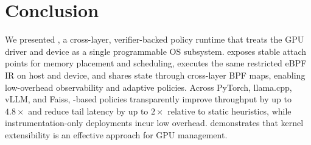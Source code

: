 \section{Conclusion}
\label{sec:conclusion}
We presented \sys, a cross-layer, verifier-backed policy runtime that treats the GPU driver and device as a single programmable OS subsystem. \sys exposes stable attach points for memory placement and scheduling, executes the same restricted eBPF IR on host and device, and shares state through cross-layer BPF maps, enabling low-overhead observability and adaptive policies. Across PyTorch, llama.cpp, vLLM, and Faiss, \sys-based policies transparently improve throughput by up to $4.8\times$ and reduce tail latency by up to $2\times$ relative to static heuristics, while instrumentation-only deployments incur low overhead. \sys demonstrates that kernel extensibility is an effective approach for GPU management.
